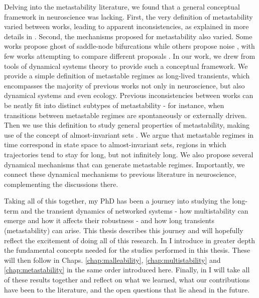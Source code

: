 Delving into the metastability literature, we found that a general conceptual framework in neuroscience was lacking. First, the very definition of metastability varied between works, leading to apparent inconsistencies, as explained in more details in . Second, the mechanisms proposed for metastability also varied. Some works propose ghost of saddle-node bifurcations \cite{tognoli2014metastable} while others propose noise \cite{brinkman2022metastable}, with few works attempting to compare different proposals \cite{graben2019metastable}. In our work, we drew from tools of dynamical systems theory to provide such a conceptual framework. We provide a simple definition of metastable regimes as long-lived transients, which encompasses the majority of previous works not only in neuroscience, but also dynamical systems and even ecology. Previous inconsistencies between works can be neatly fit into distinct subtypes of metastability - for instance, when transitions between metastable regimes are spontaneously or externally driven.
Then we use this definition to study general properties of metastability, making use of the concept of almost-invariant sets \cite{dellnitz2003congestion, froyland2005statistically}. We argue that metastable regimes in time correspond in state space to almost-invariant sets, regions in which trajectories tend to stay for long, but not infinitely long. We also propose several dynamical mechanisms that can generate metastable regimes. Importantly, we connect these dynamical mechanisms to previous literature in neuroscience, complementing the discussions there.   

Taking all of this together, my PhD has been a journey into studying the long-term and the transient dynamics of networked systems - how multistability can emerge and how it affects their robustness - and how long transients (metastability) can arise.  This thesis describes this journey and will hopefully reflect the excitement of doing all of this research. In  I introduce in greater depth the fundamental concepts needed for the studies performed in this thesis. These will then follow in Chaps. \ref{chap:malleability}, \ref{chap:multistability} and \ref{chap:metastability} in the same order introduced here. Finally, in  I will take all of these results together and reflect on what we learned, what our contributions have been to the literature, and the open questions that lie ahead in the future. 


